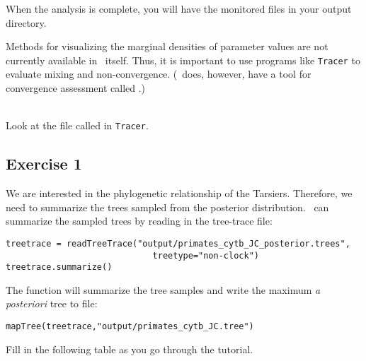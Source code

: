 When the analysis is complete, you will have the monitored files in your output directory.


Methods for visualizing the marginal densities of parameter values are not currently available in \RevBayes~itself. 
Thus, it is important to use programs like \texttt{Tracer} \citep{Rambaut2011} to evaluate mixing and non-convergence. (\RevBayes~does, however, have a tool for convergence assessment called .)

\noindent \\ \impmark Look at the file called  in \texttt{Tracer}.


\subsection{Exercise 1}

We are interested in the phylogenetic relationship of the Tarsiers. Therefore, we need to summarize the trees sampled from the posterior distribution.
\RevBayes~can summarize the sampled trees by reading in the tree-trace file:
{\tt \begin{snugshade*}
\begin{lstlisting}
treetrace = readTreeTrace("output/primates_cytb_JC_posterior.trees",
                             treetype="non-clock")
treetrace.summarize()
\end{lstlisting}
\end{snugshade*}}
The  function will summarize the tree samples and write the maximum \textit{a posteriori} tree to file:
{\tt \begin{snugshade*}
\begin{lstlisting}
mapTree(treetrace,"output/primates_cytb_JC.tree")
\end{lstlisting}
\end{snugshade*}}
Fill in the following table as you go through the tutorial.

